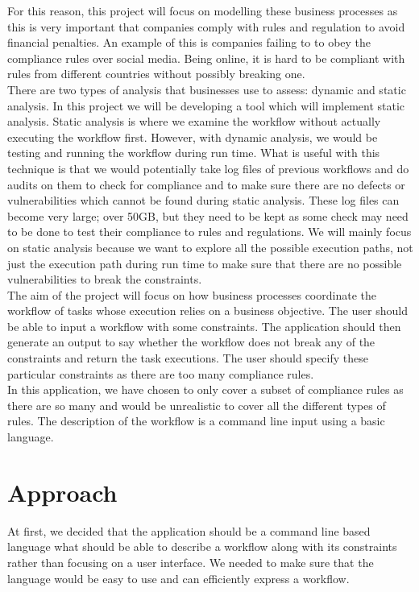 \documentclass[a4paper]{report}
\begin{document}
For this reason, this project will focus on modelling these business processes as this is very important that companies comply with rules and regulation to avoid financial penalties. An example of this is companies failing to to obey the compliance rules over social media\cite{Compliance}. Being online, it is hard to be compliant with rules from different countries without possibly breaking one. \\   

There are two types of analysis that businesses use to assess: dynamic and static analysis\cite{analysis}. In this project we will be developing a tool which will implement static analysis. Static analysis is where we examine the workflow without actually executing the workflow first. However, with dynamic analysis, we would be testing and running the workflow during run time. What is useful with this technique is that we would potentially take log files of previous workflows and do audits on them to check for compliance and to make sure there are no defects or vulnerabilities which cannot be found during static analysis. These log files can become very large; over 50GB, but they need to be kept as some check may need to be done to test their compliance to rules and regulations. We will mainly focus on static analysis because we want to explore all the possible execution paths, not just the execution path during run time to make sure that there are no possible vulnerabilities to break the constraints. \\

The aim of the project will focus on how business processes coordinate the workflow of tasks whose execution relies on a business objective. The user should be able to input a workflow with some constraints. The application should then generate an output to say whether the workflow does not break any of the constraints and return the task executions. The user should specify these particular constraints as there are too many compliance rules. \\

In this application, we have chosen to only cover a subset of compliance rules as there are so many and would be unrealistic to cover all the different types of rules. The description of the workflow is a command line input using a basic language. 

\section{Approach}
At first, we decided that the application should be a command line based language what should be able to describe a workflow along with its constraints rather than focusing on a user interface. We needed to make sure that the language would be easy to use and can efficiently express a workflow. \\
\end{document}
